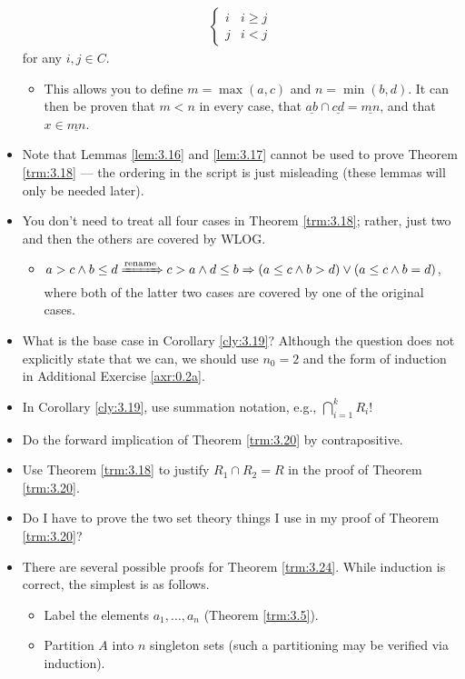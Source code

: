 \documentclass[titlepage]{report}
\begin{document}
\begin{itemize}
\begin{align*}
\begin{cases}
            i & i\geq j\\
            j & i<j
        \end{cases}
    \end{align*}
    for any $i,j\in C$.
    \begin{itemize}
        \item This allows you to define $m=\max(a,c)$ and $n=\min(b,d)$. It can then be proven that $m<n$ in every case, that $\underline{ab}\cap\underline{cd}=\underline{mn}$, and that $x\in\underline{mn}$.
    \end{itemize}
    \item Note that Lemmas \ref{lem:3.16} and \ref{lem:3.17} cannot be used to prove Theorem \ref{trm:3.18} --- the ordering in the script is just misleading (these lemmas will only be needed later).
    \item You don't need to treat all four cases in Theorem \ref{trm:3.18}; rather, just two and then the others are covered by WLOG.
    \begin{itemize}
        \item $
            a>c\wedge b\leq d \xRightarrow{\text{rename}} c>a\wedge d\leq b
            \Rightarrow (a\leq c\wedge b>d)\vee(a\leq c\wedge b=d)
        $, where both of the latter two cases are covered by one of the original cases.
    \end{itemize}
    \item What is the base case in Corollary \ref{cly:3.19}? Although the question does not explicitly state that we can, we should use $n_0=2$ and the form of induction in Additional Exercise \ref{axr:0.2a}.
    \item In Corollary \ref{cly:3.19}, use summation notation, e.g., $\bigcap_{i=1}^k R_i$!
    \item Do the forward implication of Theorem \ref{trm:3.20} by contrapositive.
    \item Use Theorem \ref{trm:3.18} to justify $R_1\cap R_2=R$ in the proof of Theorem \ref{trm:3.20}.
    \item Do I have to prove the two set theory things I use in my proof of Theorem \ref{trm:3.20}?
    \item {}There are several possible proofs for Theorem \ref{trm:3.24}. While induction is correct, the simplest is as follows.
    \begin{itemize}
        \item Label the elements $a_1,\dots,a_n$ (Theorem \ref{trm:3.5}).
        \item Partition $A$ into $n$ singleton sets (such a partitioning may be verified via induction).

\end{itemize}
\end{itemize}
\end{document}
